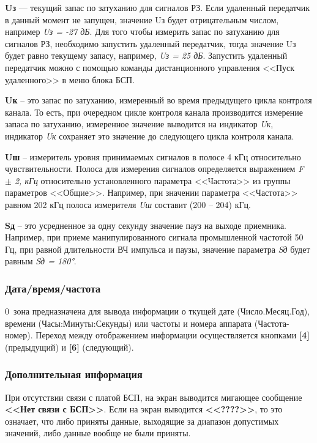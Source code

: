 \textbf{Uз} --- текущий запас по затуханию для сигналов РЗ.
Если удаленный передатчик в данный момент не запущен, значение Uз будет отрицательным числом, например \textit{Uз = -27 дБ}. 
Для того чтобы измерить запас по затуханию для сигналов РЗ, необходимо запустить удаленный передатчик, тогда значение Uз будет равно текущему запасу, например, \textit{Uз = 25 дБ}. 
Запустить удаленный передатчик можно с помощью команды дистанционного управления <<Пуск удаленного>> в меню блока БСП.

\textbf{Uк} – это запас по затуханию, измеренный во время предыдущего цикла контроля канала. 
То есть, при очередном цикле контроля канала производится измерение запаса по затуханию, 
измеренное значение выводится на индикатор \textit{Uк}, индикатор \textit{Uк} сохраняет это значение до следующего цикла контроля канала.

\textbf{Uш} – измеритель уровня принимаемых сигналов в полосе 4 кГц относительно чувствительности. 
Полоса для измерения сигналов определяется выражением \textit{F $\pm$ 2, кГц} относительно установленного параметра <<Частота>> из группы параметров <<Общие>>. 
Например, при значении параметра <<Частота>> равном 202 кГц полоса измерителя \textit{Uш} составит (200 – 204) кГц.

\textbf{Sд} – это усредненное за одну секунду значение пауз на выходе приемника. 
Например, при приеме манипулированного сигнала промышленной частотой 50 Гц, при равной длительности ВЧ импульса и паузы, значение параметра \textit{Sд} будет равным \textit{Sд = 180°}.


\subsubsection{Дата/время/частота}

0~зона предназначена для вывода информации о ткущей дате (Число.Месяц.Год), времени (Часы:Минуты:Секунды) или частоты и номера аппарата (Частота-номер). Переход между отображением информации осуществляется кнопками \textbf{[4]} (предыдущий) и \textbf{[6]} (следующий).


\subsubsection{Дополнительная информация}

При отсутствии связи с платой БСП, на экран выводится мигающее сообщение \textbf{<<Нет связи с БСП>>}. Если на экран выводится \textbf{<<????>>}, то это означает, что либо приняты данные, выходящие за диапазон допустимых значений, либо данные вообще не были приняты.

